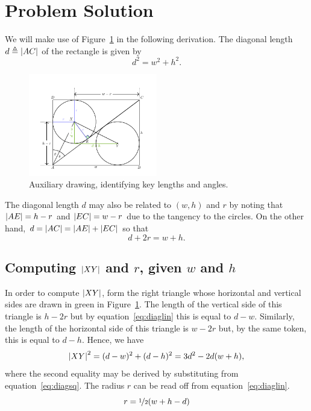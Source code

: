 \section{Problem Solution}
\label{sec:solution}

We will make use of Figure~\ref{fig:solution} in the following derivation.
The diagonal length $d \triangleq \left|{AC}\right|$ of the rectangle is given by 
%
\begin{equation}
  d^2 = w^2 + h^2.
  \label{eq:diagsq}
\end{equation}
%
\begin{figure}[h]
  \centering
  \includegraphics[trim={0 0 0 0.55cm},clip,width=0.5\textwidth]{./figures/basic2.pdf}
  \vspace{-8mm}
  \caption{Auxiliary drawing, identifying key lengths and angles.}
  \label{fig:solution}
\end{figure}
%
The diagonal length $d$ may also be related to $(w,h)$ and $r$ by noting that
$\left|{AE}\right| = h-r$ and $\left|{EC}\right| = w-r$ due to the tangency to the circles. On the
other hand, $d = \left|{AC}\right| = \left|{AE}\right| + \left|{EC}\right|$ so that 
%
\begin{equation}
  d + 2r = w + h.
  \label{eq:diaglin}
\end{equation}

\subsection{Computing $\left|{XY}\right|$ and $r$, given $w$ and $h$}
\label{ssec:compute_xyr}

In order to compute $\left|{XY}\right|$, form the right triangle whose horizontal and
vertical sides are drawn in green in Figure~\ref{fig:solution}. The length of
the vertical side of this triangle is $h-2r$ but by equation~\eqref{eq:diaglin}
this is equal to $d-w$. Similarly, the length of the horizontal side of this
triangle is $w-2r$ but, by the same token, this is equal to $d-h$. Hence, we
have
%
\begin{equation}
  \left|{XY}\right|^2 = (d-w)^2 + (d-h)^2 = 3d^2 - 2d(w+h),
  \label{eq:xylen}
\end{equation}
%
where the second equality may be derived by substituting from
equation~\eqref{eq:diagsq}. The radius $r$ can be read off from
equation~\eqref{eq:diaglin}.
%
\begin{equation}
  r = \nicefrac{1}{2}(w+h-d)
  \label{eq:radius}
\end{equation}


